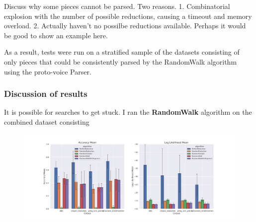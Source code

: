 \documentclass[12pt,a4paper,twoside,openany]{report} \usepackage[pdfborder={0 0 0}]{hyperref}    %
\theoremstyle{definition} \newtheorem{definition}{Definition}[section]
\begin{document}
  Discuss why some pieces cannot be parsed. Two reasons. 1. Combinatorial explosion with the number of possible
  reductions, causing a timeout and memory overload. 2. Actually haven't no possilbe reductions available. Perhaps it
  would be good to show an example here.

  As a result, tests were run on a stratified sample of the datasets consisting of only pieces that could be
  consistently parsed by the RandomWalk algorithm using the proto-voice Parser. 

  \subsubsection{Discussion of results}
  It is possible for searches to get stuck. I ran the \textbf{RandomWalk} algorithm on the combined dataset consisting

  \begin{figure}[ht]

    \includegraphics[width=\textwidth]{figs/eval/baselineResults.png}
    \caption{}
    \label{fig:baseRes}
  \end{figure}
  
\end{document}
